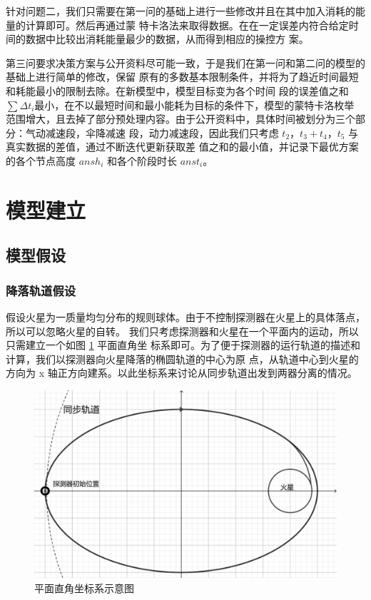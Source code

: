 \documentclass[hyperref,a4paper,UTF8]{ctexart}
\begin{document}
针对问题二，我们只需要在第一问的基础上进行一些修改并且在其中加入消耗的能量的计算即可。然后再通过蒙
特卡洛法来取得数据。在在一定误差内符合给定时间的数据中比较出消耗能量最少的数据，从而得到相应的操控方
案。

第三问要求决策方案与公开资料尽可能一致，于是我们在第一问和第二问的模型的基础上进行简单的修改，保留
原有的多数基本限制条件，并将为了趋近时间最短和耗能最小的限制去除。在新模型中，模型目标变为各个时间
段的误差值之和 $\sum\Delta t_i$​ 最小，在不以最短时间和最小能耗为目标的条件下，模型的蒙特卡洛枚举
范围增大，且去掉了部分预处理内容。由于公开资料中，具体时间被划分为三个部分：气动减速段，伞降减速
段，动力减速段，因此我们只考虑 $t_2$，$t_3+t_4$，$t_5$ 与真实数据的差值，通过不断迭代更新获取差
值之和的最小值，并记录下最优方案的各个节点高度 $ansh_i$ 和各个阶段时长 $anst_i$。
\section{模型建立}
\subsection{模型假设}
\subsubsection{降落轨道假设}
假设火星为一质量均匀分布的规则球体。由于不控制探测器在火星上的具体落点，所以可以忽略火星的自转。
我们只考虑探测器和火星在一个平面内的运动，所以只需建立一个如图 \ref{pic:syt0} 平面直角坐
标系即可。为了便于探测器的运行轨道的描述和计算，我们以探测器向火星降落的椭圆轨道的中心为原
点，从轨道中心到火星的方向为 x 轴正方向建系。以此坐标系来讨论从同步轨道出发到两器分离的情况。
\begin{figure}[ht!]
    \centering
    \includegraphics[scale=0.45]{建系示意图0.pdf}
    \caption{平面直角坐标系示意图}
    \label{pic:syt0}
\end{figure}
\end{document}
